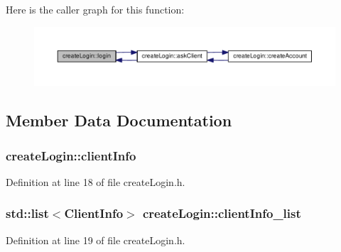 Here is the caller graph for this function\+:
\nopagebreak
\begin{figure}[H]
\begin{center}
\leavevmode
\includegraphics[width=350pt]{classcreate_login_a6012395d12f24689de88dafd5917bf89_icgraph}
\end{center}
\end{figure}




\subsection{Member Data Documentation}
\subsubsection[{\texorpdfstring{client\+Info}{clientInfo}}]{ create\+Login\+::client\+Info\hspace{0.3cm}{\ttfamily [private]}}\hypertarget{classcreate_login_a7e6af52371ef69fee03fa9f8b152c9f3}{}\label{classcreate_login_a7e6af52371ef69fee03fa9f8b152c9f3}


Definition at line 18 of file create\+Login.\+h.

\subsubsection[{\texorpdfstring{client\+Info\+\_\+list}{clientInfo_list}}]{\setlength{\rightskip}{0pt plus 5cm}std\+::list$<${\bf Client\+Info}$>$ create\+Login\+::client\+Info\+\_\+list\hspace{0.3cm}{\ttfamily [private]}}\hypertarget{classcreate_login_a5ea072e63025feb0343c502dbf821d1e}{}\label{classcreate_login_a5ea072e63025feb0343c502dbf821d1e}


Definition at line 19 of file create\+Login.\+h.

